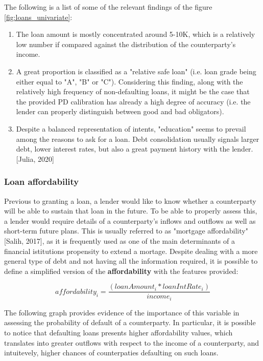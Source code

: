 \documentclass[a4paper,12pt]{article}
\begin{document}
    The following is a list of some of the relevant findings of the figure \ref{fig:loans_univariate}:
 
        \begin{enumerate} 
            \item The loan amount is mostly concentrated around 5-10K, which is a relatively low number if compared against the distribution of the counterparty's income. 
            \item A great proportion is classified as a "relative safe loan" (i.e. loan grade being either equal to "A", "B" or "C"). Considering this finding, along with the relatively high frequency of non-defaulting loans, it might be the case that the provided PD calibration has already a high degree of accuracy (i.e. the lender can properly distinguish between good and bad obligators).  
            \item Despite a balanced representation of intents, "education" seems to prevail among the reasons to ask for a loan. Debt consolidation usually signals larger debt, lower interest rates, but also a great payment history with the lender. [Julia, 2020]
        \end{enumerate}
 
    \subsubsection{Loan affordability}
    Previous to granting a loan, a lender would like to know whether a counterparty will be able to sustain that loan in the 
    future. To be able to properly assess this, a lender would require details of a counterparty's inflows and outflows 
    as well as short-term future plans. This is usually referred to as "mortgage affordability" [Salih, 2017], as it is frequently used as one 
    of the main determinants of a financial istitutions propensity to extend a mortage. Despite dealing with a more general type of debt
    and not having all the information required, it is possible to define a simplified version of the \textbf{affordability} with the features 
    provided:

        \begin{equation} affordability_{i}=\frac{(loanAmount_{i} * loanIntRate_{i})}{income_{i}}
        \end{equation}

    The following graph provides evidence of the importance of this variable in assessing the probability of default of a counterparty. 
    In particular, it is possible to notice that defaulting loans presents higher affordability values, which translates into greater outflows
    with respect to the income of a counterparty, and intuitevely, higher chances of counterpaties defaulting on such loans.
    
\end{document}
